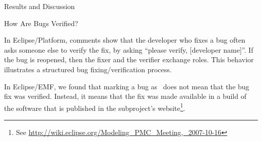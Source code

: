 \begin{section}{Results and Discussion}
\begin{subsection}{How Are Bugs Verified?}
	
	
	
  
	In Eclipse/Platform, comments show that the developer who fixes a bug often asks someone else to verify the fix, by asking ``please verify, [developer name]''. If the bug is reopened, then the fixer and the verifier exchange roles. This behavior illustrates a structured bug fixing/verification process.
	
	In Eclipse/EMF, we found that marking a bug as \VERIFIED\ does not mean that the bug fix was verified. Instead, it means that the fix was made available in a build of the software that is published in the subproject's website\footnote{See \url{http://wiki.eclipse.org/Modeling_PMC_Meeting,_2007-10-16}}.


	


\end{subsection}
\end{section}
